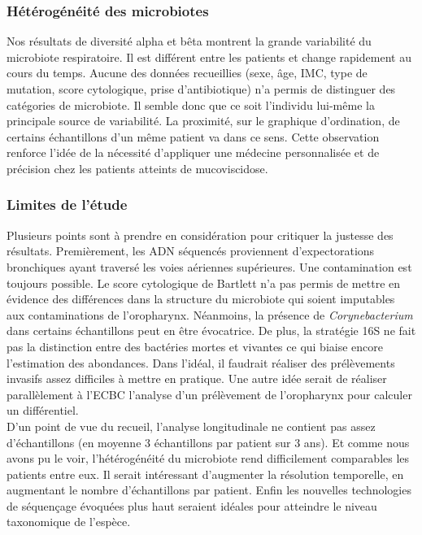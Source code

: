 \documentclass[12pt,a4paper]{article}
\begin{document}
\subsubsection{Hétérogénéité des microbiotes}
Nos résultats de diversité alpha et bêta montrent la grande variabilité du microbiote respiratoire. Il est différent entre les patients et change rapidement au cours du temps. Aucune des données recueillies (sexe, âge, IMC, type de mutation, score cytologique, prise d'antibiotique) n'a permis de distinguer des catégories de microbiote. Il semble donc que ce soit l'individu lui-même la principale source de variabilité. La proximité, sur le graphique d'ordination, de certains échantillons d'un même patient va dans ce sens. Cette observation renforce l'idée de la nécessité d'appliquer une médecine personnalisée et de précision chez les patients atteints de mucoviscidose.

\subsubsection{Limites de l'étude}
Plusieurs points sont à prendre en considération pour critiquer la justesse des résultats. Premièrement, les ADN séquencés proviennent d'expectorations bronchiques ayant traversé les voies aériennes supérieures. Une contamination est toujours possible. Le score cytologique de Bartlett n'a pas permis de mettre en évidence des différences dans la structure du microbiote qui soient imputables aux contaminations de l'oropharynx. Néanmoins, la présence de \textit{Corynebacterium} dans certains échantillons peut en être évocatrice.
De plus, la stratégie 16S ne fait pas la distinction entre des bactéries mortes et vivantes ce qui biaise encore l'estimation des abondances.
Dans l'idéal, il faudrait réaliser des prélèvements invasifs\cite{Dickson2017} assez difficiles à mettre en pratique. Une autre idée serait de réaliser parallèlement à l'ECBC l'analyse d'un prélèvement de l'oropharynx pour calculer un différentiel. \\
D'un point de vue du recueil, l'analyse longitudinale ne contient pas assez d'échantillons (en moyenne 3 échantillons par patient sur 3 ans). Et comme nous avons pu le voir, l'hétérogénéité du microbiote rend difficilement comparables les patients entre eux. Il serait intéressant d'augmenter la résolution temporelle, en augmentant le nombre d'échantillons par patient.
Enfin les nouvelles technologies de séquençage évoquées plus haut seraient idéales pour atteindre le niveau taxonomique de l'espèce.
\end{document}
